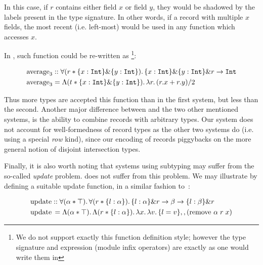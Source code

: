In this case, if $r$ contains either field $x$ or field $y$, they would be shadowed by the labels 
present in the type signature.
In other words, if a record with multiple $x$ fields, the most recent (i.e. left-most) would be used 
in any function which accesses $x$.


In \name, such function could be re-written as
\footnote{We do not support exactly this function definition style; 
however the type signature and expression (module infix operators) are exactly as one would write them
in \name}:

\begin{align*}
&\text{average}_3 :: \forall (r * \{ x : \texttt{Int} \} \& \{ y : \texttt{Int} \}).\, \{ x : \texttt{Int} \} \& \{ y : \texttt{Int} \} \& r \rightarrow \texttt{Int} \\
&\text{average}_3 = 
{\Lambda (t * \{ x : \texttt{Int} \} \& \{ y : \texttt{Int} \}).\, \lambda r.\, (r.x + r.y) / 2}
\end{align*}

Thus more types are accepted this function than in the first system, but less than the second. 
Another major difference between \name and the two other mentioned systems, is the ability to 
combine records with arbitrary types.
Our system does not account for well-formedness of record types as the other two systems do 
(i.e. using a special \emph{row} kind), since our encoding of records piggybacks on the more
general notion of disjoint intersection types. 

Finally, it is also worth noting that systems using subtyping may suffer from the so-called 
\emph{update} problem.
\name does not suffer from this problem. 
We may illustrate by defining a suitable update function, in a similar fashion 
to~\cite{leijen2005extensible}:

\begin{align*}
&\text{update} :: \forall (\alpha * \top).\, \forall (r * \{ l : \alpha \}).\, {\{ l : \alpha \} \& r \rightarrow \beta \rightarrow \{ l : \beta \} \& r} \\ 
&\text{update} \, = \Lambda (\alpha * \top).\, \Lambda (r * \{ l : \alpha \}).\, \lambda x.\, \lambda v.\, 
\{ l = v \} ,, (\text{remove } \alpha \; r \; x) 
\end{align*}


